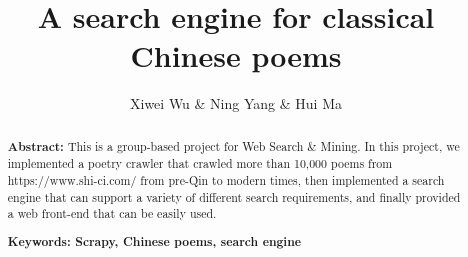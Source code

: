\documentclass{scrartcl}
\begin{document}
\title{A search engine for classical Chinese poems}
\author{Xiwei Wu \& Ning Yang \& Hui Ma}

\date{}
\maketitle

\begin{abstract}
  \textbf{Abstract:} This is a group-based project for Web Search \& Mining. In this project, we implemented a poetry crawler that crawled more than 10,000 poems from https://www.shi-ci.com/ from pre-Qin to modern times, then implemented a search engine that can support a variety of different search requirements, and finally provided a web front-end that can be easily used. 

\textbf{Keywords: Scrapy, Chinese poems, search engine}
\end{abstract}







\end{document}
